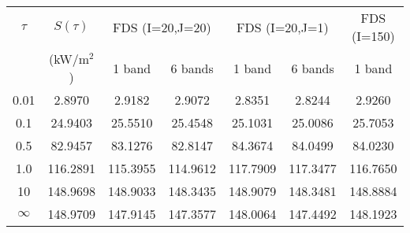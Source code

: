 \begin{center}
\begin{tabular}{|c|c|c|c|c|c|c|} \hline
$\tau$ & $S(\tau)$ & \multicolumn{2}{|c|}{FDS (I=20,J=20)} &
\multicolumn{2}{|c|}{FDS (I=20,J=1)} & FDS (I=150) \\ \cline{3-7}
 & (kW/m$^2$) & 1 band & 6 bands & 1 band & 6 bands & 1 band \\ \hline\hline
0.01 &    2.8970 &    2.9182 &    2.9072 &    2.8351 &    2.8244 &    2.9260 \\
0.1 &   24.9403 &   25.5510 &   25.4548 &   25.1031 &   25.0086 &   25.7053 \\
0.5 &   82.9457 &   83.1276 &   82.8147 &   84.3674 &   84.0499 &   84.0230 \\
1.0 &  116.2891 &  115.3955 &  114.9612 &  117.7909 &  117.3477 &  116.7650 \\
10 &  148.9698 &  148.9033 &  148.3435 &  148.9079 &  148.3481 &  148.8884 \\
$\infty$ &  148.9709 &  147.9145 &  147.3577 &  148.0064 &  147.4492 &  148.1923 \\
\hline
\end{tabular}
\end{center}
